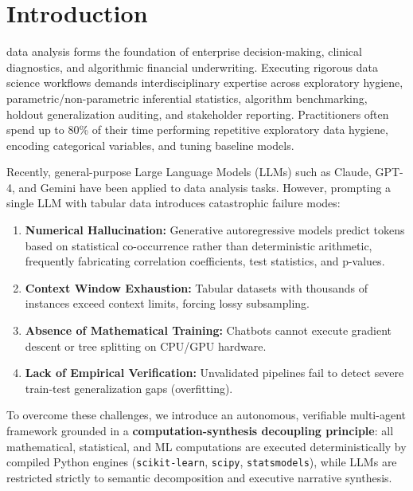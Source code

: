 \documentclass[10pt,journal,compsoc]{IEEEtran}
\begin{document}
\maketitle
\IEEEdisplaynontitleabstractindextext
\IEEEpeerreviewmaketitle

\section{Introduction}
 data analysis forms the foundation of enterprise decision-making, clinical diagnostics, and algorithmic financial underwriting. Executing rigorous data science workflows demands interdisciplinary expertise across exploratory hygiene, parametric/non-parametric inferential statistics, algorithm benchmarking, holdout generalization auditing, and stakeholder reporting. Practitioners often spend up to 80\% of their time performing repetitive exploratory data hygiene, encoding categorical variables, and tuning baseline models.

Recently, general-purpose Large Language Models (LLMs) such as Claude, GPT-4, and Gemini have been applied to data analysis tasks. However, prompting a single LLM with tabular data introduces catastrophic failure modes:
\begin{enumerate}
    \item \textbf{Numerical Hallucination:} Generative autoregressive models predict tokens based on statistical co-occurrence rather than deterministic arithmetic, frequently fabricating correlation coefficients, test statistics, and p-values.
    \item \textbf{Context Window Exhaustion:} Tabular datasets with thousands of instances exceed context limits, forcing lossy subsampling.
    \item \textbf{Absence of Mathematical Training:} Chatbots cannot execute gradient descent or tree splitting on CPU/GPU hardware.
    \item \textbf{Lack of Empirical Verification:} Unvalidated pipelines fail to detect severe train-test generalization gaps (overfitting).
\end{enumerate}

To overcome these challenges, we introduce an autonomous, verifiable multi-agent framework grounded in a \textbf{computation-synthesis decoupling principle}: all mathematical, statistical, and ML computations are executed deterministically by compiled Python engines (\texttt{scikit-learn}, \texttt{scipy}, \texttt{statsmodels}), while LLMs are restricted strictly to semantic decomposition and executive narrative synthesis.
\end{document}
